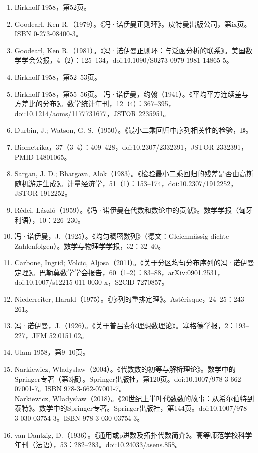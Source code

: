 \begin{enumerate}
\item Birkhoff 1958，第52页。  
\item Goodearl, Ken R.（1979）。《冯·诺伊曼正则环》。皮特曼出版公司，第ix页。ISBN 0-273-08400-3。  
\item Goodearl, Ken R.（1981）。《冯·诺伊曼正则环：与泛函分析的联系》。美国数学学会公报，4（2）：125–134，doi:10.1090/S0273-0979-1981-14865-5。  
\item Birkhoff 1958，第52–53页。  
\item Birkhoff 1958，第55–56页。  
冯·诺伊曼，约翰（1941）。《平均平方连续差与方差比的分布》。数学统计年刊，12（4）：367–395，doi:10.1214/aoms/1177731677，JSTOR 2235951。  
\item Durbin, J.; Watson, G. S.（1950）。《最小二乘回归中序列相关性的检验，I》。\item Biometrika，37（3–4）：409–428，doi:10.2307/2332391，JSTOR 2332391，PMID 14801065。  
\item Sargan, J. D.; Bhargava, Alok（1983）。《检验最小二乘回归的残差是否由高斯随机游走生成》。计量经济学，51（1）：153–174，doi:10.2307/1912252，JSTOR 1912252。  
\item Rédei, László（1959）。《冯·诺伊曼在代数和数论中的贡献》。数学学报（匈牙利语），10：226–230。  
\item 冯·诺伊曼，J.（1925）。《均匀稠密数列》（德文：Gleichmässig dichte Zahlenfolgen）。数学与物理学学报，32：32–40。  
\item Carbone, Ingrid; Volcic, Aljosa（2011）。《关于分区均匀分布序列的冯·诺伊曼定理》。巴勒莫数学学会报告，60（1–2）：83–88，arXiv:0901.2531，doi:10.1007/s12215-011-0030-x，S2CID 7270857。  
\item Niederreiter, Harald（1975）。《序列的重排定理》。Astérisque，24–25：243–261。  
\item 冯·诺伊曼，J.（1926）。《关于普吕费尔理想数理论》。塞格德学报，2：193–227，JFM 52.0151.02。  
\item Ulam 1958，第9–10页。  
\item Narkiewicz, Wladyslaw（2004）。《代数数的初等与解析理论》。数学中的Springer专著（第3版）。Springer出版社，第120页。doi:10.1007/978-3-662-07001-7。ISBN 978-3-662-07001-7。\\  
Narkiewicz, Władysław（2018）。《20世纪上半叶代数数的故事：从希尔伯特到泰特》。数学中的Springer专著。Springer出版社，第144页。doi:10.1007/978-3-030-03754-3。ISBN 978-3-030-03754-3。  
\item van Dantzig, D.（1936）。《通用或p进数及拓扑代数简介》。高等师范学校科学年刊（法语），53：282–283。doi:10.24033/asens.858。  

\end{enumerate}
